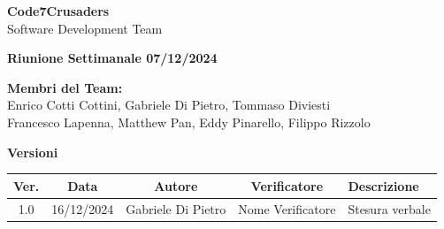 \documentclass{article}
\begin{document}
\begin{titlepage}
    {\Huge \textbf{Code7Crusaders}}\\
    \vspace{0.5cm}
    {\Large Software Development Team}\\
    \vspace{2cm}
    
    {\large \textbf{Riunione Settimanale 07/12/2024}}\\ 
    \vspace{5cm}                           
    
    
    \textbf{Membri del Team:}\\
    Enrico Cotti Cottini, Gabriele Di Pietro, Tommaso Diviesti \\
    Francesco Lapenna, Matthew Pan, Eddy Pinarello, Filippo Rizzolo \\
    \vspace{0.5cm}
    
    \vspace{1cm}
\end{titlepage}



\newpage
\begin{table}[h!]
\centering
\textbf{Versioni} \\ %
\vspace{2mm} %
\begin{tabular}{|c|c|c|c|>{\raggedright\arraybackslash}p{}|}
    \hline
    \textbf{Ver.} & \textbf{Data} & \textbf{Autore} & \textbf{Verificatore} & \textbf{Descrizione} \\
    \hline
    1.0 & 16/12/2024 & Gabriele Di Pietro & Nome Verificatore & Stesura verbale \\ 
    \hline                                  
\end{tabular}
\end{table}



\newpage
\tableofcontents



\newpage
\end{document}
